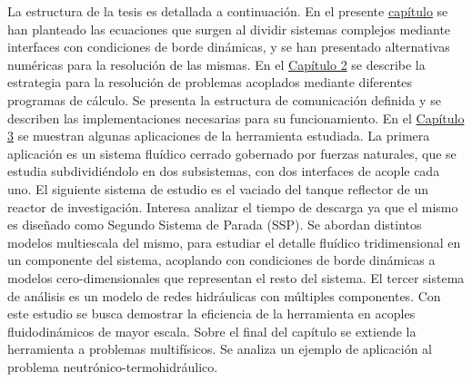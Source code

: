 La estructura de la tesis es detallada a continuación.
En el presente \hyperlink{chapter.1}{capítulo} se han planteado las ecuaciones que surgen al dividir sistemas complejos mediante interfaces con condiciones de borde dinámicas,
y se han presentado alternativas numéricas para la resolución de las mismas.
En el \hyperlink{chapter.2}{Capítulo 2} se describe la estrategia para la resolución de problemas acoplados mediante diferentes programas de cálculo.
Se presenta la estructura de comunicación definida y se describen las implementaciones necesarias para su funcionamiento.
En el \hyperlink{chapter.3}{Capítulo 3} se muestran algunas aplicaciones de la herramienta estudiada.
La primera aplicación es un sistema fluídico cerrado gobernado por fuerzas naturales, que se estudia subdividiéndolo en dos subsistemas, con dos interfaces de acople cada uno.
El siguiente sistema de estudio es el vaciado del tanque reflector de un reactor de investigación.
Interesa analizar el tiempo de descarga ya que el mismo es diseñado como Segundo Sistema de Parada (SSP).
Se abordan distintos modelos multiescala del mismo, para estudiar el detalle fluídico tridimensional en un componente del sistema,
acoplando con condiciones de borde dinámicas a modelos cero-dimensionales que representan el resto del sistema.
El tercer sistema de análisis es un modelo de redes hidráulicas con múltiples componentes.
Con este estudio se busca demostrar la eficiencia de la herramienta en acoples fluidodinámicos de mayor escala.
Sobre el final del capítulo se extiende la herramienta a problemas multifísicos.
Se analiza un ejemplo de aplicación al problema neutrónico-termohidráulico.

